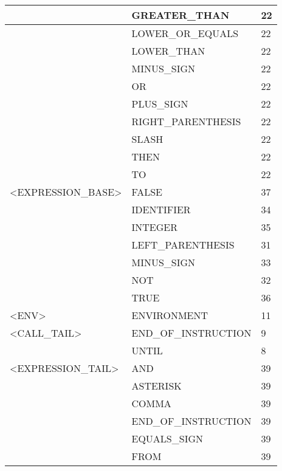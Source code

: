 \begin{longtable}{|l|l|l|}
                     &   GREATER\_THAN         &   22 \\ \hline
                     &   LOWER\_OR\_EQUALS      &   22 \\ \hline
                     &   LOWER\_THAN           &   22 \\ \hline
                     &   MINUS\_SIGN           &   22 \\ \hline
                     &   OR                   &   22 \\ \hline
                     &   PLUS\_SIGN            &   22 \\ \hline
                     &   RIGHT\_PARENTHESIS    &   22 \\ \hline
                     &   SLASH                &   22 \\ \hline
                     &   THEN                 &   22 \\ \hline
                     &   TO                   &   22 \\ \hline
<EXPRESSION\_BASE>    &   FALSE                &   37 \\ \hline
                     &   IDENTIFIER           &   34 \\ \hline
                     &   INTEGER              &   35 \\ \hline
                     &   LEFT\_PARENTHESIS     &   31 \\ \hline
                     &   MINUS\_SIGN           &   33 \\ \hline
                     &   NOT                  &   32 \\ \hline
                     &   TRUE                 &   36 \\ \hline
<ENV>                &   ENVIRONMENT          &   11 \\ \hline
<CALL\_TAIL>          &   END\_OF\_INSTRUCTION   &   9 \\ \hline
                     &   UNTIL                &   8 \\ \hline
<EXPRESSION\_TAIL>    &   AND                  &   39 \\ \hline
                     &   ASTERISK             &   39 \\ \hline
                     &   COMMA                &   39 \\ \hline
                     &   END\_OF\_INSTRUCTION   &   39 \\ \hline
                     &   EQUALS\_SIGN          &   39 \\ \hline
                     &   FROM                 &   39 \\ \hline

\end{longtable}
